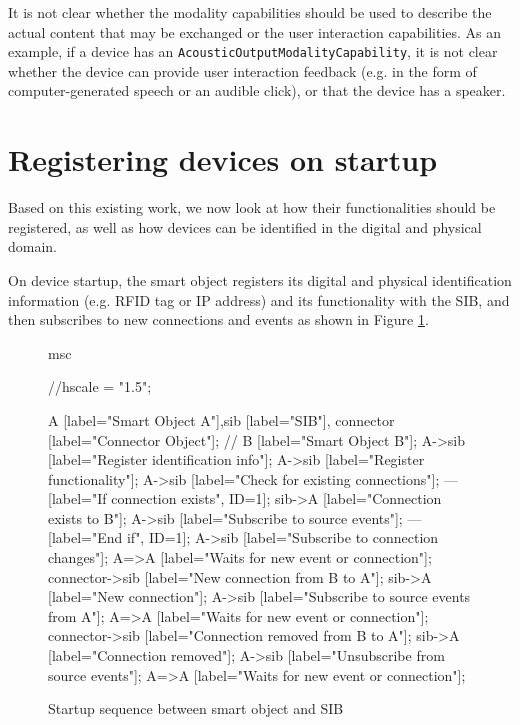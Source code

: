It is not clear whether the modality capabilities should be used to describe the actual content that may be exchanged or the user interaction capabilities. As an example, if a device has an \texttt{Acoustic\-Output\-Modality\-Capability}, it is not clear whether the device can provide user interaction feedback (e.g. in the form of computer-generated speech or an audible click), or that the device has a speaker.




\section{Registering devices on startup}

Based on this existing work, we now look at how their functionalities should be registered, as well as how devices can be identified in the digital and physical domain.

On device startup, the smart object registers its digital and physical identification information (e.g. RFID tag or IP address) and its functionality with the SIB, and then subscribes to new connections and events as shown in Figure \ref{connectorsibSequence}.

\begin{figure}[bth]
\begin{msc}
msc {
	//hscale = "1.5";
	
    A [label="Smart Object A"],sib [label="SIB"], connector [label="Connector Object"]; // B [label="Smart Object B"];
	A->sib [label="Register identification info"];
	A->sib [label="Register functionality"];
    A->sib [label="Check for existing connections"];
    --- [label="If connection exists", ID=1];
    sib->A [label="Connection exists to B"];
    A->sib [label="Subscribe to source events"];
    --- [label="End if", ID=1];
    A->sib [label="Subscribe to connection changes"];
    A=>A [label="Waits for new event or connection"];
    connector->sib [label="New connection from B to A"];
    sib->A [label="New connection"];
    A->sib [label="Subscribe to source events from A"];
    A=>A [label="Waits for new event or connection"];
    connector->sib [label="Connection removed from B to A"];
    sib->A [label="Connection removed"];
    A->sib [label="Unsubscribe from source events"];
    A=>A [label="Waits for new event or connection"];
}
\end{msc}
        \caption{Startup sequence between smart object and SIB}
        \label{connectorsibSequence}
\end{figure}

